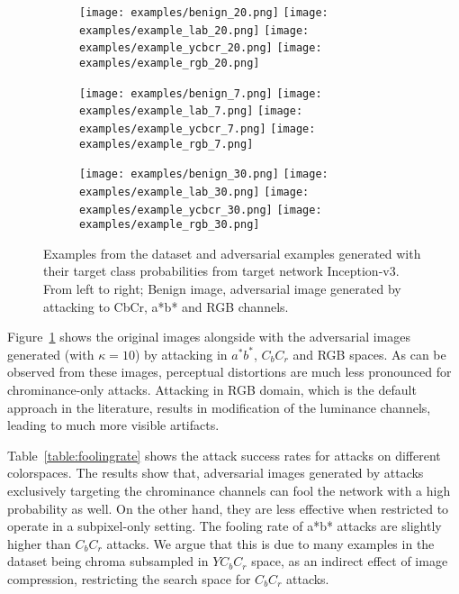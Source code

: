 \begin{figure}[ht]
    \ContinuedFloat
    \begin{subfigure}[b]{\linewidth}
        \caption{}
        \texttt{[image: examples/benign\_20.png]}
        \texttt{[image: examples/example\_lab\_20.png]}
        \texttt{[image: examples/example\_ycbcr\_20.png]}
        \texttt{[image: examples/example\_rgb\_20.png]}
    \end{subfigure}

    \begin{subfigure}[b]{\linewidth}
        \caption{}
        \texttt{[image: examples/benign\_7.png]}
        \texttt{[image: examples/example\_lab\_7.png]}
        \texttt{[image: examples/example\_ycbcr\_7.png]}
        \texttt{[image: examples/example\_rgb\_7.png]}
    \end{subfigure}

    \begin{subfigure}[b]{\linewidth}
        \caption{}
        \texttt{[image: examples/benign\_30.png]}
        \texttt{[image: examples/example\_lab\_30.png]}
        \texttt{[image: examples/example\_ycbcr\_30.png]}
        \texttt{[image: examples/example\_rgb\_30.png]}
    \end{subfigure}


    \caption{Examples from the dataset and adversarial examples generated with their target class probabilities from target network Inception-v3. From left to right; Benign image, adversarial image generated by attacking to CbCr, a*b* and RGB channels. }\label{fig:visualprob}
\end{figure}

Figure~\ref{fig:visualprob} shows the original images alongside with the adversarial images generated (with \(\kappa = 10\)) by attacking in \(a^*b^*\), \(C_{b}C_{r}\) and RGB spaces. As can be observed from these images, perceptual distortions are much less pronounced for chrominance-only attacks. Attacking in RGB domain, which is the default approach in the literature, results in modification of the luminance channels, leading to much more visible artifacts.

Table~\ref*{table:foolingrate} shows the attack success rates for attacks on different colorspaces. The results show that, adversarial images generated by attacks exclusively targeting the chrominance channels can fool the network with a high probability as well. On the other hand, they are less effective when restricted to operate in a subpixel-only setting. The fooling rate of a*b* attacks are slightly higher than \(C_bC_r\) attacks. We argue that this is due to many examples in the dataset being chroma subsampled in \(YC_bC_r\) space, as an indirect effect of image compression, restricting the search space for \(C_bC_r\) attacks.

